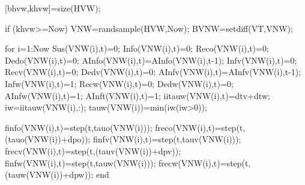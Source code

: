                                [bhvw,khvw]=size(HVW);
                               
                               if (khvw>=Now)
                                    VNW=randsample(HVW,Now);
                                    BVNW=setdiff(VT,VNW);
                                    
                                    for i=1:Now
                                                Sus(VNW(i),t)=0;
                                                Info(VNW(i),t)=0;
                                                Reco(VNW(i),t)=0;
                                                Dedo(VNW(i),t)=0;
                                                AInfo(VNW(i),t)=AInfo(VNW(i),t-1);
                                                Infv(VNW(i),t)=0;
                                                Recv(VNW(i),t)=0;
                                                Dedv(VNW(i),t)=0;
                                                AInfv(VNW(i),t)=AInfv(VNW(i),t-1); 
                                                Infw(VNW(i),t)=1;
                                                Recw(VNW(i),t)=0;
                                                Dedw(VNW(i),t)=0;
                                                AInfw(VNW(i),t)=1; 
                                                AInft(VNW(i),t)=1; 
                                                iitauw(VNW(i),t)=dtv+dtw;
                                                iw=iitauw(VNW(i),:);
                                                tauw(VNW(i))=min(iw(iw>0)); 
                                                                                                                                          
                                                finfo(VNW(i),t)=step(t,tauo(VNW(i))); %
                                                freco(VNW(i),t)=step(t,(tauo(VNW(i))+dpo)); %
                                                finfv(VNW(i),t)=step(t,tauv(VNW(i))); %
                                                frecv(VNW(i),t)=step(t,(tauv(VNW(i))+dpv)); %
                                                finfw(VNW(i),t)=step(t,tauw(VNW(i))); %
                                                frecw(VNW(i),t)=step(t,(tauw(VNW(i))+dpw)); %
                                    end
                                    
